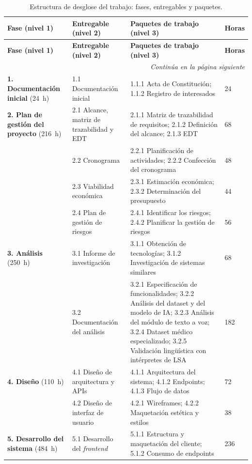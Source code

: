 {\footnotesize
\begin{longtable}{@{}p{3.0cm}p{3.4cm}p{6.9cm}p{1.1cm}@{}}
\caption{Estructura de desglose del trabajo: fases, entregables y paquetes.}\label{tab:edt}\\
\toprule
\textbf{Fase (nivel 1)} & \textbf{Entregable (nivel 2)} & \textbf{Paquetes de trabajo (nivel 3)} & \textbf{Horas} \\
\midrule
\endfirsthead
\toprule
\textbf{Fase (nivel 1)} & \textbf{Entregable (nivel 2)} & \textbf{Paquetes de trabajo (nivel 3)} & \textbf{Horas} \\
\midrule
\endhead
\midrule
\multicolumn{4}{r}{\emph{Continúa en la página siguiente}}\\
\endfoot
\bottomrule
\endlastfoot
\textbf{1. Documentación inicial} (24~h) & 1.1 Documentación inicial & 1.1.1 Acta de Constitución; 1.1.2 Registro de interesados & 24 \\
\midrule
\textbf{2. Plan de gestión del proyecto} (216~h) & 2.1 Alcance, matriz de trazabilidad y EDT & 2.1.1 Matriz de trazabilidad de requisitos; 2.1.2 Definición del alcance; 2.1.3 EDT & 68 \\
 & 2.2 Cronograma & 2.2.1 Planificación de actividades; 2.2.2 Confección del cronograma & 48 \\
 & 2.3 Viabilidad económica & 2.3.1 Estimación económica; 2.3.2 Determinación del presupuesto & 44 \\
 & 2.4 Plan de gestión de riesgos & 2.4.1 Identificar los riesgos; 2.4.2 Planificar la gestión de riesgos & 56 \\
\midrule
\textbf{3. Análisis} (250~h) & 3.1 Informe de investigación & 3.1.1 Obtención de tecnologías; 3.1.2 Investigación de sistemas similares & 68 \\
 & 3.2 Documentación del análisis & 3.2.1 Especificación de funcionalidades; 3.2.2 Análisis del dataset y del modelo de IA; 3.2.3 Análisis del módulo de texto a voz; 3.2.4 Dataset médico especializado; 3.2.5 Validación lingüística con intérpretes de LSA & 182 \\
\midrule
\textbf{4. Diseño} (110~h) & 4.1 Diseño de arquitectura y APIs & 4.1.1 Arquitectura del sistema; 4.1.2 Endpoints; 4.1.3 Flujo de datos & 72 \\
 & 4.2 Diseño de interfaz de usuario & 4.2.1 Wireframes; 4.2.2 Maquetación estética y estilos & 38 \\
\midrule
\textbf{5. Desarrollo del sistema} (484~h) & 5.1 Desarrollo del \emph{frontend} & 5.1.1 Estructura y maquetación del cliente; 5.1.2 Consumo de endpoints & 236 \\

\end{longtable}}
